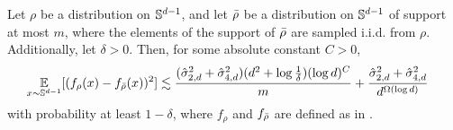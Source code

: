 \begin{lemma}  \label{lemma:finite_width_error}
Let $\rho$ be a distribution on $\mathbb{S}^{d - 1}$, and let ${\bar{\rho}}$ be a distribution on $\mathbb{S}^{d - 1}$ of support at most $m$, where the elements of the support of ${\bar{\rho}}$ are sampled i.i.d. from $\rho$. Additionally, let $\delta > 0$. Then, for some absolute constant $C > 0$,
\begin{align}
\operatorname*{\mathbb{E}}_{x \sim \mathbb{S}^{d - 1}} [(f_\rho(x) - f_{{\bar{\rho}}}(x))^2]
& \lesssim \frac{(\hat{\sigma}_{2, d}^2 + \hat{\sigma}_{4, d}^2) (d^2 + \log \frac{1}{\delta}) (\log d)^C}{m} + \frac{\hat{\sigma}_{2, d}^2 + \hat{\sigma}_{4, d}^2}{d^{\Omega(\log d)}}
\end{align}
with probability at least $1 - \delta$, where $f_\rho$ and $f_{{\bar{\rho}}}$ are defined as in .
\end{lemma}
